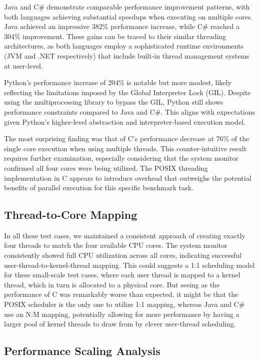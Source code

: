\documentclass[12pt,a4paper]{article}
\begin{document}
Java and C\# demonstrate comparable performance improvement patterns, with both languages achieving substantial speedups when executing on multiple cores. Java achieved an impressive 382\% performance increase, while C\# reached a 304\% improvement. These gains can be traced to their similar threading architectures, as both languages employ a sophisticated runtime environments (JVM and .NET respectively) that include built-in thread management systems at user-level.

Python's performance increase of 204\% is notable but more modest, likely reflecting the limitations imposed by the Global Interpreter Lock (GIL). Despite using the multiprocessing library to bypass the GIL, Python still shows performance constraints compared to Java and C\#. This aligns with expectations given Python's higher-level abstraction and interpreter-based execution model.

The most surprising finding was that of C's performance decrease at 76\% of the single core execution when using multiple threads. This counter-intuitive result requires further examination, especially considering that the system monitor confirmed all four cores were being utilized. The POSIX threading implementation in C appears to introduce overhead that outweighs the potential benefits of parallel execution for this specific benchmark task.

\subsection{Thread-to-Core Mapping}

In all these test cases, we maintained a consistent approach of creating exactly four threads to match the four available CPU cores. The system monitor consistently showed full CPU utilization across all cores, indicating successful user-thread-to-kernel-thread mapping. This could suggests a 1:1 scheduling model for these small-scale test cases, where each user thread is mapped to a kernel thread, which in turn is allocated to a physical core. But seeing as the performance of C was remarkably worse than expected, it might be that the POSIX scheduler is the only one to utilize 1:1 mapping, whereas Java and C\# use an N:M mapping, potentially allowing for more performance by having a larger pool of kernel threads to draw from by clever user-thread scheduling.

\subsection{Performance Scaling Analysis}
\end{document}
